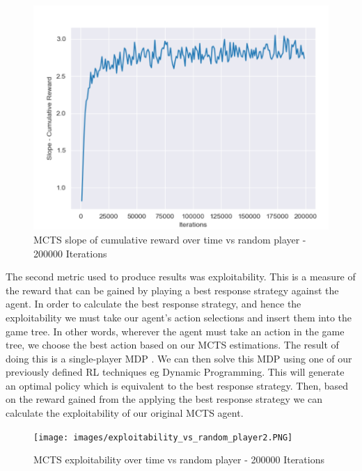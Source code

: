 \begin{figure}[ht]
    \includegraphics[scale=.8]{images/slope_cumulative_reward_vs_random_player.PNG}
    \caption{MCTS slope of cumulative reward over time vs random player - 200000 Iterations}
\end{figure}

The second metric used to produce results was exploitability.
This is a measure of the reward that can be gained by playing a best response strategy
against the agent.
In order to calculate the best response strategy, and hence the exploitability we must
take our agent's action selections and insert them into the game tree\citep{heinrich2017reinforcement}.
In other words, wherever the agent must take an action in the game tree, we choose the best action
based on our MCTS estimations.
The result of doing this is a single-player MDP .
We can then solve this MDP using one of our previously defined RL techniques eg Dynamic Programming.
This will generate an optimal policy which is equivalent to the best response strategy.
Then, based on the reward gained from the applying the best response strategy we can
calculate the exploitability of our original MCTS agent.

\begin{figure}[ht]
    \texttt{[image: images/exploitability\_vs\_random\_player2.PNG]}
    \caption{MCTS exploitability over time vs random player - 200000 Iterations}
\end{figure}

